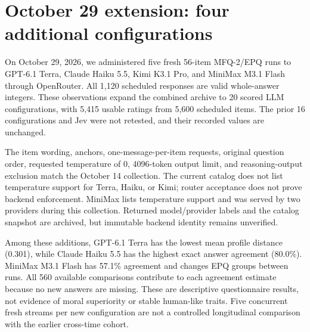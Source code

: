 \documentclass[11pt]{article}
\begin{document}
\section{October 29 extension: four additional configurations}\label{sec:october29}
On October 29, 2026, we administered five fresh 56-item MFQ-2/EPQ runs to GPT-6.1 Terra, Claude Haiku 5.5, Kimi K3.1 Pro, and MiniMax M3.1 Flash through OpenRouter. All 1,120 scheduled responses are valid whole-answer integers. These observations expand the combined archive to 20 scored LLM configurations, with 5,415 usable ratings from 5,600 scheduled items. The prior 16 configurations and Jev were not retested, and their recorded values are unchanged.

The item wording, anchors, one-message-per-item requests, original question order, requested temperature of 0, 4096-token output limit, and reasoning-output exclusion match the October 14 collection. The current catalog does not list temperature support for Terra, Haiku, or Kimi; router acceptance does not prove backend enforcement. MiniMax lists temperature support and was served by two providers during this collection. Returned model/provider labels and the catalog snapshot are archived, but immutable backend identity remains unverified.

\begin{table}[htbp]\centering\small
{}
\caption{October 29 additions: five fresh administrations per model; all answers satisfy strict whole-answer integer parsing.}
\end{table}
Among these additions, GPT-6.1 Terra has the lowest mean profile distance (0.301), while Claude Haiku 5.5 has the highest exact answer agreement (80.0\%). MiniMax M3.1 Flash has 57.1\% agreement and changes EPQ groups between runs. All 560 available comparisons contribute to each agreement estimate because no new answers are missing. These are descriptive questionnaire results, not evidence of moral superiority or stable human-like traits. Five concurrent fresh streams per new configuration are not a controlled longitudinal comparison with the earlier cross-time cohort.
\end{document}

